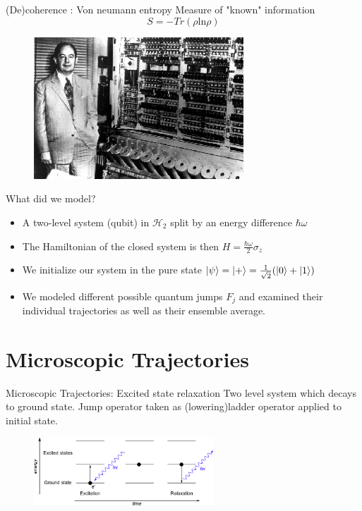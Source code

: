 \documentclass{beamer}
\begin{document}
\begin{frame}{(De)coherence : Von neumann entropy}
	Measure of "known" information
	\begin{equation}
	S = -Tr(\rho \text{ln}\rho)
	\end{equation}
	\begin{figure}
		\centering
		\includegraphics[width=0.7\textwidth]{figs/von_neumann_5.jpeg}
	\end{figure}
\end{frame}

\begin{frame}{What did we model?}
	\begin{itemize}
		\item A two-level system (qubit) in $\mathcal{H}_2$ split by an energy difference $\hbar \omega$
		\item The Hamiltonian of the closed system is then $H = \frac{\hbar \omega}{2} \sigma_z$
		\item We initialize our system in the pure state $\ket{\psi} = \ket{+} = \frac{1}{\sqrt{2}} (\ket{0} + \ket{1})$
		\item We modeled different possible quantum jumps $F_j$ and examined their individual trajectories as well as their ensemble average.
	\end{itemize}
\end{frame}


\section{Microscopic Trajectories}
\begin{frame}{Microscopic Trajectories: Excited state relaxation}
	Two level system which decays to ground state.
	Jump operator taken as (lowering)ladder operator applied to initial state.
	\begin{figure}[h]
		\centering
		\includegraphics[width=0.6\textwidth]{figs/relaxation.png}
		\label{fig:digraph}
	\end{figure}
\end{frame}
\end{document}
